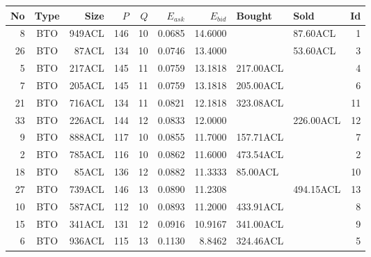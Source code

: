 \begin{tabular}{|r|c|r|r|r|r|r|p{2cm}|p{2cm}|r|}
\hline

No & Type & Size & $P$ & $Q$ & $E_{ask}$ & $E_{bid}$ & Bought & Sold & Id \\
\hline
8 & BTO & 949ACL & 146 & 10 & 0.0685 & 14.6000 &    & 87.60ACL & 1 \\
\hline
26 & BTO & 87ACL & 134 & 10 & 0.0746 & 13.4000 &    & 53.60ACL & 3 \\
\hline
5 & BTO & 217ACL & 145 & 11 & 0.0759 & 13.1818 & 217.00ACL &    & 4 \\
\hline
7 & BTO & 205ACL & 145 & 11 & 0.0759 & 13.1818 & 205.00ACL &    & 6 \\
\hline
21 & BTO & 716ACL & 134 & 11 & 0.0821 & 12.1818 & 323.08ACL &    & 11 \\
\hline
33 & BTO & 226ACL & 144 & 12 & 0.0833 & 12.0000 &    & 226.00ACL & 12 \\
\hline
9 & BTO & 888ACL & 117 & 10 & 0.0855 & 11.7000 & 157.71ACL &    & 7 \\
\hline
2 & BTO & 785ACL & 116 & 10 & 0.0862 & 11.6000 & 473.54ACL &    & 2 \\
\hline
18 & BTO & 85ACL & 136 & 12 & 0.0882 & 11.3333 & 85.00ACL &    & 10 \\
\hline
27 & BTO & 739ACL & 146 & 13 & 0.0890 & 11.2308 &    & 494.15ACL & 13 \\
\hline
10 & BTO & 587ACL & 112 & 10 & 0.0893 & 11.2000 & 433.91ACL &    & 8 \\
\hline
15 & BTO & 341ACL & 131 & 12 & 0.0916 & 10.9167 & 341.00ACL &    & 9 \\
\hline
6 & BTO & 936ACL & 115 & 13 & 0.1130 & 8.8462 & 324.46ACL &    & 5 \\
\hline
\end{tabular}
